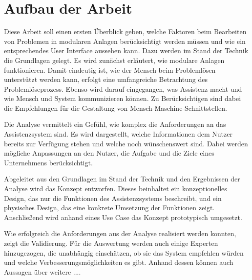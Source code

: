 \section*{Aufbau der Arbeit}
Diese Arbeit soll einen ersten Überblick geben, welche Faktoren beim Bearbeiten von Problemen in modularen Anlagen berücksichtigt werden müssen und wie ein entsprechendes User Interface aussehen kann. Dazu werden im Stand der Technik die Grundlagen gelegt. Es wird zunächst erläutert, wie modulare Anlagen funktionieren. Damit eindeutig ist, wie der Mensch beim Problemlösen unterstützt werden kann, erfolgt eine umfangreiche Betrachtung des Problemlöseprozess. Ebenso wird darauf eingegangen, was Assistenz macht und wie Mensch und System kommunizieren können. Zu Berücksichtigen sind dabei die Empfehlungen für die Gestaltung von Mensch-Maschine-Schnittstellen.

Die Analyse vermittelt ein Gefühl, wie komplex die Anforderungen an das Assistenzsystem sind. Es wird dargestellt, welche Informationen dem Nutzer bereits zur Verfügung stehen und welche noch wünschenswert sind. Dabei werden mögliche Anpassungen an den Nutzer, die Aufgabe und die Ziele eines Unternehmens berücksichtigt.

Abgeleitet aus den Grundlagen im Stand der Technik und den Ergebnissen der Analyse wird das Konzept entworfen. Dieses beinhaltet ein konzeptionelles Design, das nur die Funktionen des Assistenzsystems beschreibt, und ein physisches Design, das eine konkrete Umsetzung der Funktionen zeigt. Anschließend wird anhand eines Use Case das Konzept prototypisch umgesetzt.

Wie erfolgreich die Anforderungen aus der Analyse realisiert werden konnten, zeigt die Validierung. Für die Auswertung werden auch einige Experten hinzugezogen, die unabhängig einschätzen, ob sie das System empfehlen würden und welche Verbesserungsmöglichkeiten es gibt. Anhand dessen können auch Aussagen über weitere .... 